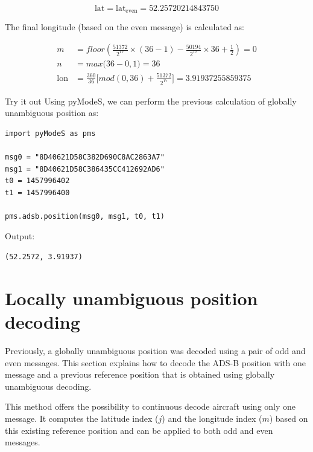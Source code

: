 \begin{equation}
  \mathrm{lat} = \mathrm{lat}_\mathrm{even} = 52.25720214843750
\end{equation}

The final longitude (based on the even message) is calculated as:

\begin{align}
  m &= floor \left( \frac{51372}{2^{17}} \times (36-1) - \frac{50194}{2^{17}} \times 36 + \frac{1}{2}  \right) = 0\\
  n &= max \Big( 36-0, 1 \Big) = 36\\
    \mathrm{lon} &= \frac{360}{36} \Big[ mod(0, 36) + \frac{51372}{2^{17}} \Big] = 3.91937255859375
\end{align}

\begin{notebox}{Try it out}
Using pyModeS, we can perform the previous calculation of globally unambiguous position as: 

\begin{verbatim}
import pyModeS as pms

msg0 = "8D40621D58C382D690C8AC2863A7"
msg1 = "8D40621D58C386435CC412692AD6"
t0 = 1457996402
t1 = 1457996400

pms.adsb.position(msg0, msg1, t0, t1)
\end{verbatim}

Output: 

\begin{verbatim}
(52.2572, 3.91937)
\end{verbatim}

\end{notebox}



\section{Locally unambiguous position decoding}

Previously, a globally unambiguous position was decoded using a pair of odd and even messages. This section explains how to decode the ADS-B position with one message and a previous reference position that is obtained using globally unambiguous decoding.

This method offers the possibility to continuous decode aircraft using only one message. It computes the latitude index ($j$) and the longitude index ($m$) based on this existing reference position and can be applied to both odd and even messages.

